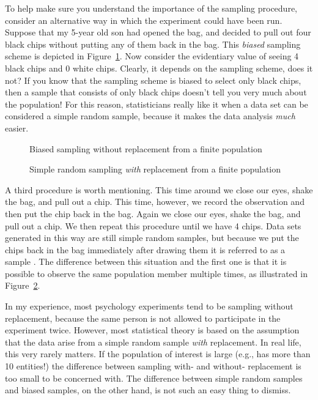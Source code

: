 To help make sure you understand the importance of the sampling procedure, consider an alternative way in which the experiment could have been run. Suppose that my 5-year old son had opened the bag, and decided to pull out four black chips without putting any of them back in the bag. This {\it biased} sampling scheme is depicted in Figure~\ref{fig:brs}. Now consider the evidentiary value of seeing 4 black chips and 0 white chips. Clearly, it depends on the sampling scheme, does it not? If you know that the sampling scheme is biased to select only black chips, then a sample that consists of only black chips doesn't tell you very much about the population! For this reason, statisticians really like it when a data set can be considered a simple random sample, because it makes the data analysis {\it much} easier.  

\begin{figure}[t]
\begin{center}
\end{center}
\caption{Biased sampling without replacement from a finite population}
\label{fig:brs}
\HR
\end{figure}

\begin{figure}[t]
\begin{center}
\end{center}
\caption{Simple random sampling {\it with} replacement from a finite population}
\label{fig:srs2}
\HR
\end{figure}

A third procedure is worth mentioning. This time around we close our eyes, shake the bag, and pull out a chip. This time, however, we record the observation and then put the chip back in the bag. Again we close our eyes, shake the bag, and pull out a chip. We then repeat this procedure until we have 4 chips. Data sets generated in this way are still simple random samples, but because we put the chips back in the bag immediately after drawing them it is referred to as a sample . The difference between this situation and the first one is that it is possible to observe the same population member multiple times, as illustrated in Figure~\ref{fig:srs2}. 

In my experience, most psychology experiments tend to be sampling without replacement, because the same person is not allowed to participate in the experiment twice. However, most statistical theory is based on the assumption that the data arise from a simple random sample {\it with} replacement. In real life, this very rarely matters. If the population of interest is large (e.g., has more than 10 entities!) the difference between sampling with- and without- replacement is too small to be concerned with. The difference between simple random samples and biased samples, on the other hand, is not such an easy thing to dismiss.


